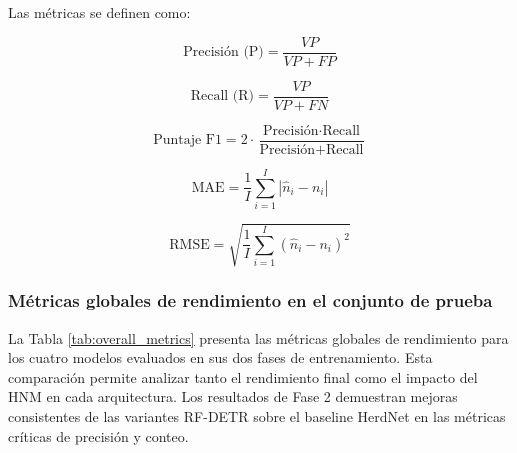 \noindent Las métricas se definen como:

\[
\text{Precisión (P)} = \frac{VP}{VP + FP}
\]

\[
\text{Recall (R)} = \frac{VP}{VP + FN}
\]

\[
\text{Puntaje F1} = 2 \cdot \frac{\text{Precisión} \cdot \text{Recall}}{\text{Precisión} + \text{Recall}}
\]

\[
\text{MAE} = \frac{1}{I} \sum_{i=1}^{I} \left| \hat{n}_i - n_i \right|
\]

\[
\text{RMSE} = \sqrt{\frac{1}{I} \sum_{i=1}^{I} \left( \hat{n}_i - n_i \right)^2}
\]

\subsubsection{Métricas globales de rendimiento en el conjunto de prueba}
La Tabla \ref{tab:overall_metrics} presenta las métricas globales de rendimiento para los cuatro modelos evaluados en sus dos fases de entrenamiento. Esta comparación permite analizar tanto el rendimiento final como el impacto del HNM en cada arquitectura. Los resultados de Fase 2 demuestran mejoras consistentes de las variantes RF-DETR sobre el baseline HerdNet en las métricas críticas de precisión y conteo.

\begin{table}[ht]
\centering
\caption{Métricas globales de rendimiento en el conjunto de prueba: comparación Fase 1 (entrenamiento inicial) vs Fase 2 (con Hard Negative Mining).}
\label{tab:overall_metrics}
\end{table}

